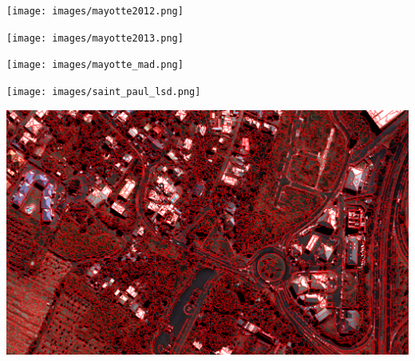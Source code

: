 \documentclass[smaller]{beamer}
\begin{document}
\vspace*{-6.5mm}
\begin{frame}[plain]
\hspace*{-11mm}
    \texttt{[image: images/mayotte2012.png]}
\end{frame}

\vspace*{-6.5mm}
\begin{frame}[plain]
\hspace*{-11mm}
    \texttt{[image: images/mayotte2013.png]}
\end{frame}

\vspace*{-6.5mm}
\begin{frame}[plain]
\hspace*{-11mm}
    \texttt{[image: images/mayotte\_mad.png]}
\end{frame}

\vspace*{-6.5mm}
\begin{frame}[plain]
\hspace*{-11mm}
\texttt{[image: images/saint\_paul\_lsd.png]}
\end{frame}


\vspace*{-6.5mm}
\begin{frame}[plain]
\hspace*{-11mm}
    \includegraphics[keepaspectratio,height=1.1\paperheight]{images/segmentation.png}
\end{frame}
\end{document}
